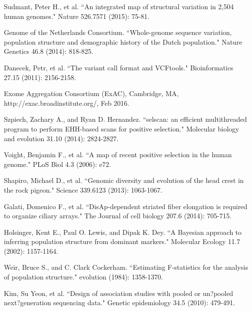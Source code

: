 \documentclass[10pt,letterpaper]{article}
\begin{document}
%
%
% 
\begin{thebibliography}{10}
Sudmant, Peter H., et al. ``An integrated map of structural variation in 2,504 human genomes." Nature 526.7571 (2015): 75-81.

Genome of the Netherlands Consortium. ``Whole-genome sequence variation, population structure and demographic history of the Dutch population." Nature Genetics 46.8 (2014): 818-825.

Danecek, Petr, et al. ``The variant call format and VCFtools." Bioinformatics 27.15 (2011): 2156-2158.

Exome Aggregation Consortium (ExAC), Cambridge, MA, http://exac.broadinstitute.org/, Feb 2016.

Szpiech, Zachary A., and Ryan D. Hernandez. ``selscan: an efficient multithreaded program to perform EHH-based scans for positive selection." Molecular biology and evolution 31.10 (2014): 2824-2827.

Voight, Benjamin F., et al. ``A map of recent positive selection in the human genome." PLoS Biol 4.3 (2006): e72.

Shapiro, Michael D., et al. ``Genomic diversity and evolution of the head crest in the rock pigeon." Science 339.6123 (2013): 1063-1067.

Galati, Domenico F., et al. ``DisAp-dependent striated fiber elongation is required to organize ciliary arrays." The Journal of cell biology 207.6 (2014): 705-715.

Holsinger, Kent E., Paul O. Lewis, and Dipak K. Dey. ``A Bayesian approach to inferring population structure from dominant markers." Molecular Ecology 11.7 (2002): 1157-1164.

Weir, Bruce S., and C. Clark Cockerham. ``Estimating F-statistics for the analysis of population structure." evolution (1984): 1358-1370.

Kim, Su Yeon, et al. ``Design of association studies with pooled or un?pooled next?generation sequencing data." Genetic epidemiology 34.5 (2010): 479-491.


\end{thebibliography}
\end{document}
